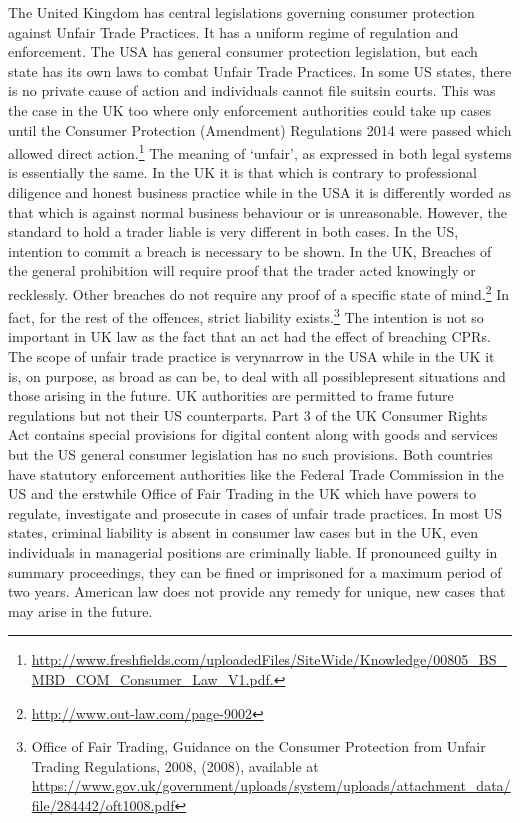 \begin{multicols}{2}

\noi
The United Kingdom has central legislations governing consumer protection against Unfair
Trade Practices. It has a uniform regime of regulation and enforcement. The USA has general
consumer protection legislation, but each state has its own laws to combat Unfair Trade Practices.
In some US states, there is no private cause of action and individuals cannot file suitsin courts.
This was the case in the UK too where only enforcement authorities could take up cases until
the Consumer Protection (Amendment) Regulations 2014 were passed which allowed direct
action.\footnote{\url{http://www.freshfields.com/uploadedFiles/SiteWide/Knowledge/00805_BS_MBD_COM_Consumer_Law_V1.pdf.}} The meaning of ‘unfair’, as expressed in both legal systems is essentially the same. In
the UK it is that which is contrary to professional diligence and honest business practice while
in the USA it is differently worded as that which is against normal business behaviour or is
unreasonable. However, the standard to hold a trader liable is very different in both cases. In
the US, intention to commit a breach is necessary to be shown. In the UK, Breaches of the
general prohibition will require proof that the trader acted knowingly or recklessly. Other
breaches do not require any proof of a specific state of mind.\footnote{\url{http://www.out-law.com/page-9002}} In fact, for the rest of the offences, strict liability exists.\footnote{Office of Fair Trading, Guidance on the Consumer Protection from Unfair Trading Regulations, 2008, (2008), available at\\ \url{https://www.gov.uk/government/uploads/system/uploads/attachment_data/file/284442/oft1008.pdf}} The intention is not so important in UK law as the fact that an act had the effect of breaching CPRs. The scope of unfair trade practice is verynarrow in the USA while in the UK it is, on purpose, as broad as can be, to deal with all possiblepresent situations and those arising in the future. UK authorities are permitted to frame future regulations but not their US counterparts. Part 3 of the UK Consumer Rights Act contains special provisions for digital content along with goods and services but the US general consumer legislation has no such provisions. Both countries have statutory enforcement authorities like the Federal Trade Commission in the US and the erstwhile Office of Fair Trading in the UK which have powers to regulate, investigate and prosecute in cases of unfair trade practices. In most US states, criminal liability is absent in consumer law cases but in the UK, even individuals in managerial positions are criminally liable. If pronounced guilty in summary proceedings, they can be fined or imprisoned for a maximum period of two years. American law does not provide any remedy for unique, new cases that may arise in the future.


\end{multicols}
